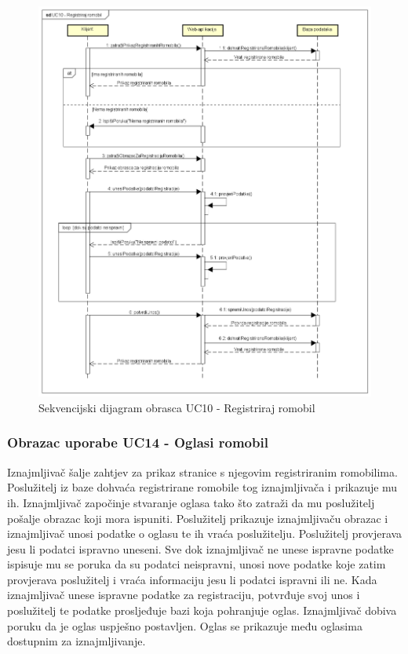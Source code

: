 						\begin{figure} [H]
							
							\includegraphics[width=1\linewidth]{dijagrami/UC10 - Registriraj romobil.png}
							\centering
							\caption{Sekvencijski dijagram obrasca UC10 - Registriraj romobil}
							\label{fig:Sekvencijski dijagram obrasca UC10 - Registriraj romobil}
						\end{figure}
				
				\eject

				\subsubsection{Obrazac uporabe UC14 - Oglasi romobil}
						Iznajmljivač šalje zahtjev za prikaz stranice s njegovim registriranim romobilima. Poslužitelj iz baze dohvaća registrirane romobile tog iznajmljivača i prikazuje mu ih. Iznajmljivač započinje stvaranje oglasa tako što zatraži da mu poslužitelj pošalje obrazac koji mora ispuniti. Poslužitelj prikazuje iznajmljivaču obrazac i iznajmljivač unosi podatke o oglasu te ih vraća poslužitelju. Poslužitelj provjerava jesu li podatci ispravno uneseni. Sve dok iznajmljivač ne unese ispravne podatke ispisuje mu se poruka da su podatci neispravni, unosi nove podatke koje zatim provjerava poslužitelj i vraća informaciju jesu li podatci ispravni ili ne. Kada iznajmljivač unese ispravne podatke za registraciju, potvrđuje svoj unos i poslužitelj te podatke prosljeđuje bazi koja pohranjuje oglas. Iznajmljivač dobiva poruku da je oglas uspješno postavljen. Oglas se prikazuje među oglasima dostupnim za iznajmljivanje.
						
